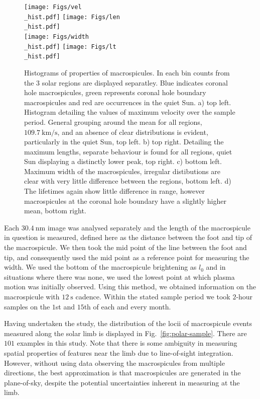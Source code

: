\begin{figure}[t!]
	\centering
	\texttt{[image: Figs/vel\\\_hist.pdf]}
	\texttt{[image: Figs/len\\\_hist.pdf]}\\
	
	\texttt{[image: Figs/width\\\_hist.pdf]}
	\texttt{[image: Figs/lt\\\_hist.pdf]}	
	\caption{\small Histograms of properties of macrospicules. In each bin counts from the 3 solar regions are displayed separatley. Blue indicates coronal hole macrospicules, green represents coronal hole boundary macrospicules and red are occurrences in the quiet Sun. a) top left. Histogram detailing the values of maximum velocity over the sample period. General grouping around the mean for all regions, $109.7\ \textrm{km/s}$, and an absence of clear distributions is evident, particularly in the quiet Sun, top left. b) top right. Detailing the maximum lengths, separate behaviour is found for all regions, quiet Sun displaying a distinctly lower peak, top right. c) bottom left. Maximum width of the macrospicules, irregular distibutions are clear with very little difference between the regions, bottom left. d) The lifetimes again show little difference in range, however macrospicules at the coronal hole boundary have a slightly higher mean, bottom right.}
	\label{fig:basic-prop}
\end{figure}


Each $30.4\ \textrm{nm}$ image was analysed separately and the length of the macrospicule in question is measured, defined here as the distance between the foot and tip of the macrospicule. We then took the mid point of the line between the foot and tip, and consequently used the mid point as a reference point for measuring the width. We used the bottom of the macrospicule brightening as $l_0$ and in situations where there was none, we used the lowest point at which plasma motion was initially observed. Using this method, we obtained information on the macrospicule with $12\ \textrm{s}$ cadence. Within the stated sample period we took $2$-hour samples on the $1$st and $15$th of each and every month.

Having undertaken the study, the distribution of the locii of macrospicule events measured along the solar limb is displayed in Fig.~\ref{fig:polar-sample}. There are $101$ examples in this study. Note that there is some ambiguity in measuring spatial properties of features near the limb due to line-of-sight integration. However, without using data observing the macrospicules from multiple directions, the best approximation is that macrospicules are generated in the plane-of-sky, despite the potential uncertainties inherent in measuring at the limb.



